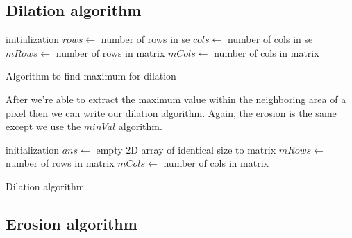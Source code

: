 \documentclass{article}
\begin{document}
\subsection{Dilation algorithm}

\begin{algorithm}[H]
 initialization\;
 \State $rows\gets$ number of rows in se\;
 \State $cols \gets$ number of cols in se\;
 \State $mRows \gets$ number of rows in matrix\;
 \State $mCols \gets$ number of cols in matrix\;
\newline
\caption{Algorithm to find maximum for dilation}
\end{algorithm}
\vspace{3mm}
After we're able to extract the maximum value within the neighboring area of a pixel then we can write our dilation algorithm. Again, the erosion is the same except we use the $minVal$ algorithm.

\begin{algorithm}[H]
 initialization\;
 \State $ans\gets$ empty 2D array of identical size to matrix\;
 \State $mRows \gets$ number of rows in matrix\;
 \State $mCols \gets$ number of cols in matrix\;
 \caption{Dilation algorithm}
\end{algorithm}
\vspace{8mm}
\subsection{Erosion algorithm}
\end{document}
